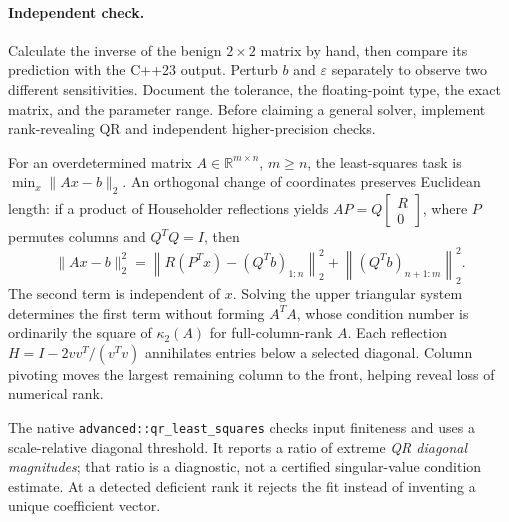 \paragraph{Independent check.}
Calculate the inverse of the benign \(2\times2\) matrix by hand, then
compare its prediction with the C++23 output. Perturb \(b\) and
\(\varepsilon\) separately to observe two different sensitivities.
Document the tolerance, the floating-point type, the exact matrix,
and the parameter range. Before claiming a general solver, implement
rank-revealing QR and independent higher-precision checks.


\begin{booktwoproof}
For an overdetermined matrix \(A\in\mathbb{R}^{m\times n}\), \(m\ge n\),
the least-squares task is \(\min_x\|Ax-b\|_2\).
An orthogonal change of coordinates preserves Euclidean length:
if a product of Householder reflections yields
\(AP=Q\begin{bmatrix}R\\0\end{bmatrix}\), where \(P\) permutes
columns and \(Q^TQ=I\), then
\[
 \|Ax-b\|_2^2=
 \left\|R(P^Tx)-(Q^Tb)_{1:n}\right\|_2^2+
 \left\|(Q^Tb)_{n+1:m}\right\|_2^2 .
\]
The second term is independent of \(x\). Solving the upper
triangular system determines the first term without forming
\(A^TA\), whose condition number is ordinarily the square of
\(\kappa_2(A)\) for full-column-rank \(A\). Each reflection
\(H=I-2vv^T/(v^Tv)\) annihilates entries below a selected
diagonal. Column pivoting moves the largest remaining column
to the front, helping reveal loss of numerical rank.

The native \texttt{advanced::qr\_least\_squares} checks
input finiteness and uses a scale-relative diagonal threshold.
It reports a ratio of extreme \emph{QR diagonal magnitudes};
that ratio is a diagnostic, not a certified singular-value
condition estimate. At a detected deficient rank it rejects
the fit instead of inventing a unique coefficient vector.
\end{booktwoproof}

